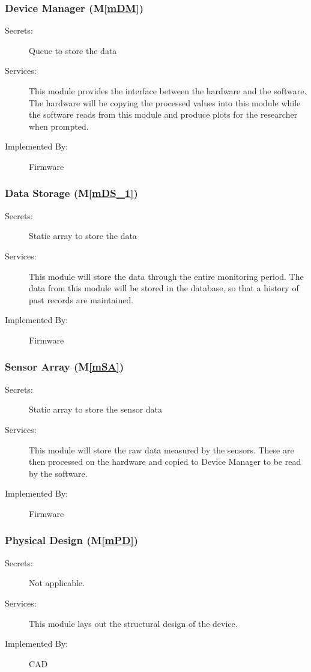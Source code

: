 \documentclass[12pt, titlepage]{article}
\newcommand{\mref}[1]{M\ref{#1}}
\begin{document}
\subsubsection{Device Manager (\mref{mDM})}
\begin{description}
  \item[Secrets:] Queue to store the data
  \item[Services:] This module provides the interface between the hardware and the
    software. The hardware will be copying the processed values into this module while the software reads from this module and produce plots for the researcher when prompted.
  \item[Implemented By:] Firmware
\end{description}

\subsubsection{Data Storage (\mref{mDS_1})}
\begin{description}
  \item[Secrets:] Static array to store the data
  \item[Services:] This module will store the data through the entire monitoring period. The data from this module will be stored in the database, so that a history of past records are maintained.
  \item[Implemented By:] Firmware
\end{description}

\subsubsection{Sensor Array (\mref{mSA})}
\begin{description}
  \item[Secrets:] Static array to store the sensor data
  \item[Services:] This module will store the raw data measured by the sensors. These are then processed on the hardware and copied to Device Manager to be read by the software.
  \item[Implemented By:] Firmware
\end{description}

\subsubsection{Physical Design (\mref{mPD})}
\begin{description}
  \item[Secrets:] Not applicable.
  \item[Services:] This module lays out the structural design of the device.
  \item[Implemented By:] CAD
\end{description}
\end{document}
